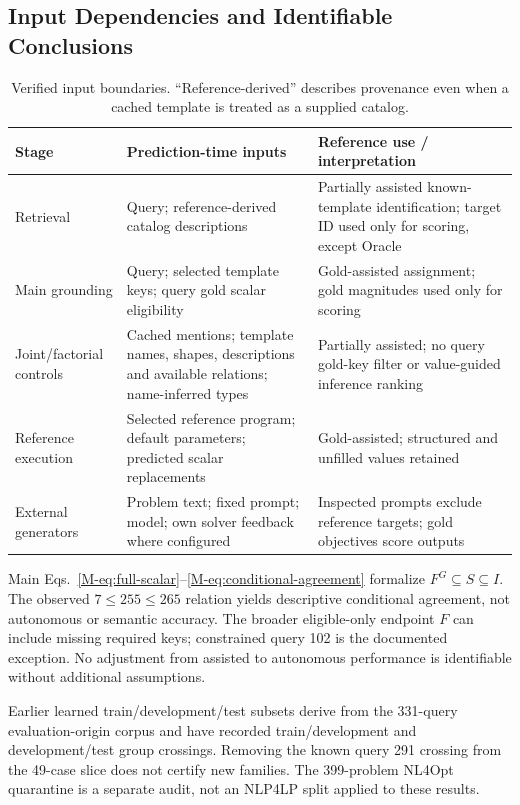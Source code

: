 \subsection{Input Dependencies and Identifiable Conclusions}
\label{app:input-dependencies}
\begin{table}[htbp]
\centering\small
\caption{Verified input boundaries. ``Reference-derived'' describes
provenance even when a cached template is treated as a supplied catalog.}
\label{tab:input-dependencies}
\begin{tabularx}{\linewidth}{@{}lXX@{}}
\toprule
Stage & Prediction-time inputs & Reference use / interpretation\\
\midrule
Retrieval & Query; reference-derived catalog descriptions & Partially assisted known-template identification; target ID used only for scoring, except Oracle\\
Main grounding & Query; selected template keys; query gold scalar eligibility & Gold-assisted assignment; gold magnitudes used only for scoring\\
Joint/factorial controls & Cached mentions; template names, shapes, descriptions and available relations; name-inferred types & Partially assisted; no query gold-key filter or value-guided inference ranking\\
Reference execution & Selected reference program; default parameters; predicted scalar replacements & Gold-assisted; structured and unfilled values retained\\
External generators & Problem text; fixed prompt; model; own solver feedback where configured & Inspected prompts exclude reference targets; gold objectives score outputs\\
\bottomrule
\end{tabularx}
\end{table}

Main Eqs.~\eqref{M-eq:full-scalar}--\eqref{M-eq:conditional-agreement} formalize $F^G\subseteq S\subseteq I$. The observed $7\leq255\leq265$ relation yields descriptive conditional agreement, not autonomous or semantic accuracy. The broader eligible-only endpoint $F$ can include missing required keys; constrained query 102 is the documented exception. No adjustment from assisted to autonomous performance is identifiable without additional assumptions.

Earlier learned train/development/test subsets derive from the 331-query evaluation-origin corpus and have recorded train/development and development/test group crossings. Removing the known query 291 crossing from the 49-case slice does not certify new families. The 399-problem NL4Opt quarantine is a separate audit, not an NLP4LP split applied to these results.


